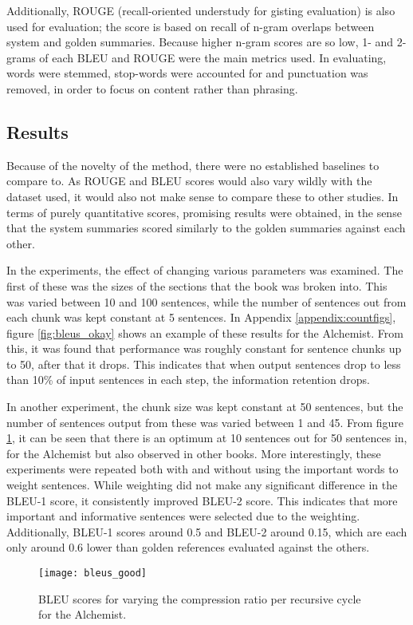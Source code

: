Additionally, ROUGE (recall-oriented understudy for gisting evaluation) is also used for evaluation; the score is based on recall of n-gram overlaps between system and golden summaries. Because higher n-gram scores are so low, 1- and 2- grams of each BLEU and ROUGE were the main metrics used. In evaluating, words were stemmed, stop-words were accounted for and punctuation was removed, in order to focus on content rather than phrasing.

\subsection{Results}
Because of the novelty of the method, there were no established baselines to compare to. As ROUGE and BLEU scores would also vary wildly with the dataset used, it would also not make sense to compare these to other studies. In terms of purely quantitative scores, promising results were obtained, in the sense that the system summaries scored similarly to the golden summaries against each other.

In the experiments, the effect of changing various parameters was examined. The first of these was the sizes of the sections that the book was broken into. This was varied between 10 and 100 sentences, while the number of sentences out from each chunk was kept constant at 5 sentences. In Appendix \ref{appendix:countfigs}, figure \ref{fig:bleus_okay} shows an example of these results for the Alchemist. From this, it was found that performance was roughly constant for sentence chunks up to 50, after that it drops. This indicates that when output sentences drop to less than 10\% of input sentences in each step, the information retention drops.

In another experiment, the chunk size was kept constant at 50 sentences, but the number of sentences output from these was varied between 1 and 45. From figure \ref{fig:bleus}, it can be seen that there is an optimum at 10 sentences out for 50 sentences in, for the Alchemist but also observed in other books. More interestingly, these experiments were repeated both with and without using the important words to weight sentences. While weighting did not make any significant difference in the BLEU-1 score, it consistently improved BLEU-2 score. This indicates that more important and informative sentences were selected due to the weighting. Additionally, BLEU-1 scores around 0.5 and BLEU-2 around 0.15, which are each only around 0.6 lower than golden references evaluated against the others.

\begin{figure}[H]
	\centering
	\texttt{[image: bleus\_good]}
	\caption{BLEU scores for varying the compression ratio per recursive cycle for the Alchemist. }\label{fig:bleus}
\end{figure}

